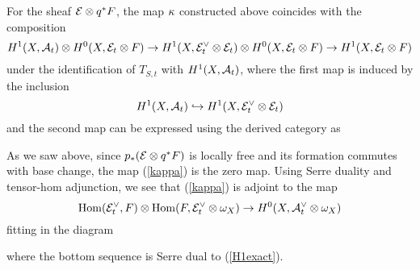 \documentclass[letterpaper,12pt]{article}
\theoremstyle{remark}
\begin{document}
For the sheaf $\mathcal{E} \otimes q^*F$, the map $\kappa$ constructed above coincides with the composition
\begin{equation}\label{kappa}
H^1(X, \mathcal{A}_t) \otimes H^0(X, \mathcal{E}_t \otimes F) \to H^1(X, \mathcal{E}_t^\vee \otimes \mathcal{E}_t) \otimes H^0(X, \mathcal{E}_t \otimes F) \to H^1(X, \mathcal{E}_t \otimes F)
\end{equation}
under the identification of $T_{S,t}$ with $H^1(X, \mathcal{A}_t)$, where the first map is induced by the inclusion 
\[ H^1(X, \mathcal{A}_t) \hookrightarrow H^1(X, \mathcal{E}_t^\vee \otimes \mathcal{E}_t) \] 
and the second map can be expressed using the derived category as
\begin{center}
\end{center}
As we saw above, since $p_*(\mathcal{E} \otimes q^*F)$ is locally free and its formation commutes with base change, the map (\ref{kappa}) is the zero map. Using Serre duality and tensor-hom adjunction, we see that (\ref{kappa}) is adjoint to the map
\[ \mathrm{Hom}(\mathcal{E}_t^\vee, F) \otimes \mathrm{Hom}(F, \mathcal{E}_t^\vee \otimes \omega_X) \to H^0(X, \mathcal{A}_t^\vee \otimes \omega_X) \]
fitting in the diagram
\begin{center}
\end{center}
where the bottom sequence is Serre dual to (\ref{H1exact}).
\end{document}
